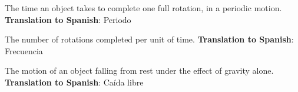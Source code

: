\begin{vocabulary}[Period]
    The time an object takes to complete one full rotation, in a periodic motion. \newline
    \textbf{Translation to Spanish}: Periodo
\end{vocabulary}

\begin{vocabulary}[Frequency]
    The number of rotations completed per unit of time. \newline
    \textbf{Translation to Spanish}: Frecuencia
\end{vocabulary}

\begin{vocabulary}
    The motion of an object falling from rest under the effect of gravity alone. \newline
    \textbf{Translation to Spanish}: Caída libre
\end{vocabulary}
